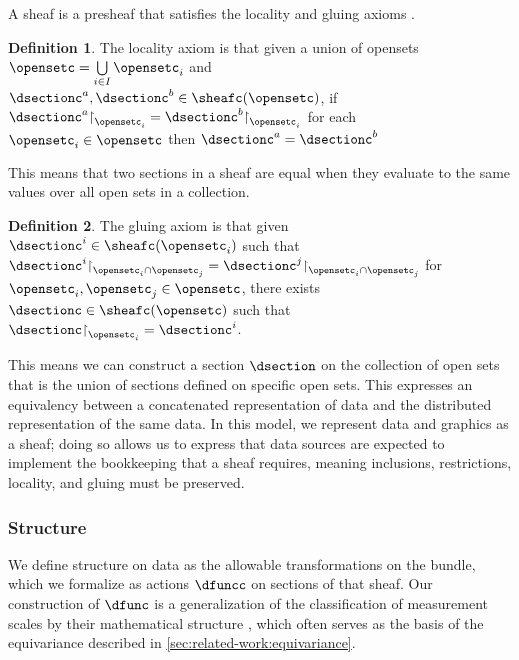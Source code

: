\documentclass[10pt,journal,compsoc]{IEEEtran}
\renewcommand{\restriction}{\mathord{\upharpoonright}} %
\theoremstyle{definition}
\newtheorem{definition}{Definition}[section]
\theoremstyle{remark}
\begin{document}
A sheaf is a presheaf that satisfies the locality and gluing axioms \cite{bakerMathsSheaf}. 
\begin{definition}
\label{def:atct:sheaf:locality}
The locality axiom is that given a union of opensets $\mathscr{\opensetc} = \bigcup\limits_{i\in I} \opensetc_i$ and $\dsectionc^{a}, \dsectionc^{b} \in \sheafc(\mathscr{\opensetc})$,  if $\dsectionc^{a}\restriction_{\opensetc_i} = \dsectionc^{b}\restriction_{\opensetc_i}$ for each $\opensetc_i \in \opensetc$ then $\dsectionc^{a} = \dsectionc^{b}$
\end{definition}
This means that two sections in a sheaf are equal when they evaluate to the same values over all open sets in a collection. 
\begin{definition}
\label{def:atct:sheaf:gluing}
The gluing axiom is that given $\dsectionc^{i} \in \sheafc(\opensetc_i)$ such that ${\dsectionc^{i}}\restriction_{\opensetc_i\cap \opensetc_j} = {\dsectionc^{j}}\restriction_{\opensetc_i \cap \opensetc_j}$ for $\opensetc_i, \opensetc_j \in \mathscr{\opensetc}$, there exists $\dsectionc \in \sheafc(\mathscr{\opensetc})$ such that $\dsectionc\restriction_{\opensetc_i} = {\dsectionc^{i}}$. 
\end{definition}
This means we can construct a section $\dsection$ on the collection of open sets that is the union of sections defined on specific open sets. This expresses an equivalency between a concatenated representation of data and the distributed representation of the same data. In this model, we represent data and graphics as a sheaf; doing so allows us to express that data sources are expected to implement the bookkeeping that a sheaf requires, meaning inclusions, restrictions, locality, and gluing must be preserved. 

\subsubsection{Structure}
\label{sec:atct:sheaves:measurments}
We define structure on data as the allowable \textcolor{action}{transformations on the bundle}, which we formalize as actions $\dfuncc$ on sections of that sheaf. Our construction of $\dfunc$ is a generalization of the classification of measurement scales by their mathematical structure \cite{stevensTheoryScalesMeasurement1946,leaFormalizationMeasurementScale, thomasMathematizationNotMeasurement2014}, which often serves as the basis of the equivariance described in \autoref{sec:related-work:equivariance}.
\end{document}
